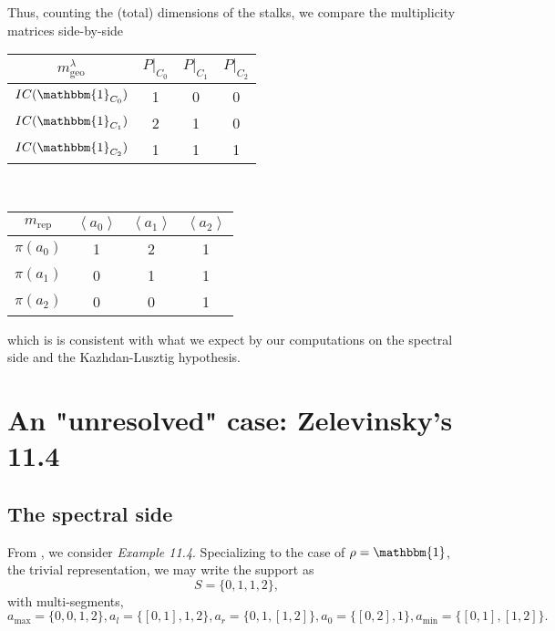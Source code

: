 \documentclass{memoir}
\newcommand{\la}{\left\langle}
\newcommand{\ra}{\right\rangle}
\newcommand{\tx}{\text}
\theoremstyle{definition}
\begin{document}
	Thus, counting the (total) dimensions of the stalks, we compare the multiplicity matrices side-by-side
	\begin{center}
		\begin{tabular}{c | c c c}
			$m_{\tx{geo}}^\lambda$ & $P|_{C_0}$ & $P|_{C_1}$ & $P|_{C_2}$ \\
			\hline
			$IC(\mathbbm{1}_{C_0})$ & 1 & 0 & 0 \\
			$IC(\mathbbm{1}_{C_1})$ & 2 & 1 & 0 \\
			$IC(\mathbbm{1}_{C_2})$ & 1 & 1 & 1
		\end{tabular} \ \ \ \ \ \ \ \ \begin{tabular}{ c | c c c }
			$m_{\tx{rep}}$ & $\la a_0\ra$ & $\la a_1\ra$ & $\la a_2\ra$ \\
			\hline 
			$\pi(a_0)$ & 1 & 2 & 1 \\
			$\pi(a_1)$ & 0 & 1 & 1 \\
			$\pi(a_2)$ & 0 & 0 & 1
		\end{tabular}
	\end{center}
	which is is consistent with what we expect by our computations on the spectral side and the Kazhdan-Lusztig hypothesis.  
	
	
	
	
	
	
	
	
	
	
	
	
	
	
	
	
	
	
	
	
	
	
	
	
	
	
	
	
	
	\section{An "unresolved" case: Zelevinsky's 11.4}
	
	\subsection{The spectral side}
	
	From \cite{ZelI2}, we consider \emph{Example 11.4}.  
	Specializing to the case of $\rho=\mathbbm{1}$, the trivial representation, we may write the support as 
	$$S=\{0, 1, 1, 2\},$$
	with multi-segments,
	$$a_{\tx{max}}=\{0, 0, 1, 2\}, a_l=\{[0, 1], 1, 2\}, a_r=\{0, 1, [1, 2]\}, a_0=\{[0, 2], 1\}, a_{\tx{min}}=\{[0, 1], [1, 2]\}.$$
	
\end{document}
